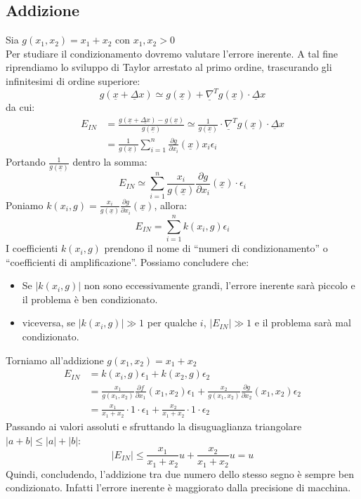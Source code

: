 \documentclass[12pt]{report}
\begin{document}
\subsection{Addizione}
Sia $g(x_1, x_2) = x_1 + x_2$ con $x_1, x_2 > 0$ \\
Per studiare il condizionamento dovremo valutare l'errore inerente.  A tal fine riprendiamo lo sviluppo di Taylor arrestato al primo ordine, trascurando gli infinitesimi di ordine superiore:
\[
g(\underline{x} + \underline{\Delta}x) \simeq g(\underline{x}) + \underline{\nabla}^Tg(\underline{x}) \cdot \underline{\Delta}x
\]
da cui:
\begin{align*}
	E_{IN} &= \frac{g(\underline{x} + \underline{\Delta x}) - g(\underline{x})}{g(\underline{x})} \simeq \frac{1}{g(\underline{x})} \cdot \underline{\nabla}^Tg(\underline{x})\cdot \underline{\Delta}x \\
	&= \frac{1}{g(\underline{x})}\sum_{i=1}^{n}\frac{\partial g}{\partial x_i}(\underline{x})x_i\epsilon_i
\end{align*}
Portando  $\frac{1}{g(\underline{x})}$ dentro la somma:
\[
E_{IN} \simeq \sum_{i=1}^{n}\frac{x_i}{g(\underline{x})}\frac{\partial g}{\partial x_i}(\underline{x}) \cdot \epsilon_i
\]
Poniamo $k(x_i, g) = \frac{x_i}{g(\underline{x})}\frac{\partial g}{\partial x_i}(\underline{x})$, allora:
\[
E_{IN} = \sum_{i=1}^{n}k(x_i, g)\epsilon_i
\]
I coefficienti $k(x_i, g)$ prendono il nome di ``numeri di condizionamento'' o ``coefficienti di amplificazione''. Possiamo concludere che:
\begin{itemize}
	\item Se $|k(x_i, g)|$ non sono eccessivamente grandi, l'errore inerente sarà piccolo e il problema è ben condizionato.
	\item viceversa, se $|k(x_i, g)| \gg 1$ per qualche $i$,  $|E_{IN}| \gg 1$ e il problema sarà mal condizionato.
\end{itemize}
Torniamo all'addizione $g(x_1, x_2) = x_1 + x_2$
\begin{align*}
	E_{IN} &= k(x_i, g)\epsilon_1 + k(x_2, g)\epsilon_2 \\
&= \frac{x_1}{g(x_1, x_2)}\frac{\partial f}{\partial x_1}(x_1, x_2)\epsilon_1 + \frac{x_2}{g(x_1, x_2)}\frac{\partial g}{\partial x_2}(x_1, x_2) \epsilon_2 \\
&= \frac{x_1}{x_1 + x_2} \cdot 1 \cdot \epsilon_1 + \frac{x_2}{x_1 + x_2}\cdot 1 \cdot \epsilon_2
\end{align*}
Passando ai valori assoluti e sfruttando la disuguaglianza triangolare $|a+b| \leq |a| + |b|$:
\[
|E_{IN}| \leq \frac{x_1}{x_1 + x_2}u + \frac{x_2}{x_1 + x_2}u = u
\]
Quindi, concludendo, l'addizione tra due numero dello stesso segno è sempre ben condizionato. Infatti l'errore inerente è maggiorato dalla precisione di macchina.
\end{document}

